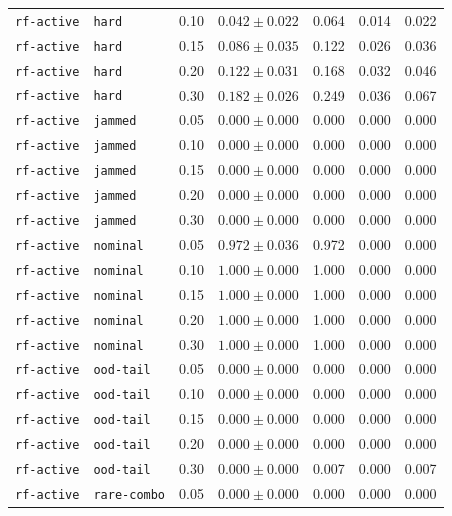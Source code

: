 \documentclass{article}
\begin{document}
\begin{center}
\begin{tabular}{lllcccc}
\texttt{rf-active} & \texttt{hard} & 0.10 & $0.042 \pm 0.022$ & 0.064 & 0.014 & 0.022 \\
\texttt{rf-active} & \texttt{hard} & 0.15 & $0.086 \pm 0.035$ & 0.122 & 0.026 & 0.036 \\
\texttt{rf-active} & \texttt{hard} & 0.20 & $0.122 \pm 0.031$ & 0.168 & 0.032 & 0.046 \\
\texttt{rf-active} & \texttt{hard} & 0.30 & $0.182 \pm 0.026$ & 0.249 & 0.036 & 0.067 \\
\texttt{rf-active} & \texttt{jammed} & 0.05 & $0.000 \pm 0.000$ & 0.000 & 0.000 & 0.000 \\
\texttt{rf-active} & \texttt{jammed} & 0.10 & $0.000 \pm 0.000$ & 0.000 & 0.000 & 0.000 \\
\texttt{rf-active} & \texttt{jammed} & 0.15 & $0.000 \pm 0.000$ & 0.000 & 0.000 & 0.000 \\
\texttt{rf-active} & \texttt{jammed} & 0.20 & $0.000 \pm 0.000$ & 0.000 & 0.000 & 0.000 \\
\texttt{rf-active} & \texttt{jammed} & 0.30 & $0.000 \pm 0.000$ & 0.000 & 0.000 & 0.000 \\
\texttt{rf-active} & \texttt{nominal} & 0.05 & $0.972 \pm 0.036$ & 0.972 & 0.000 & 0.000 \\
\texttt{rf-active} & \texttt{nominal} & 0.10 & $1.000 \pm 0.000$ & 1.000 & 0.000 & 0.000 \\
\texttt{rf-active} & \texttt{nominal} & 0.15 & $1.000 \pm 0.000$ & 1.000 & 0.000 & 0.000 \\
\texttt{rf-active} & \texttt{nominal} & 0.20 & $1.000 \pm 0.000$ & 1.000 & 0.000 & 0.000 \\
\texttt{rf-active} & \texttt{nominal} & 0.30 & $1.000 \pm 0.000$ & 1.000 & 0.000 & 0.000 \\
\texttt{rf-active} & \texttt{ood-tail} & 0.05 & $0.000 \pm 0.000$ & 0.000 & 0.000 & 0.000 \\
\texttt{rf-active} & \texttt{ood-tail} & 0.10 & $0.000 \pm 0.000$ & 0.000 & 0.000 & 0.000 \\
\texttt{rf-active} & \texttt{ood-tail} & 0.15 & $0.000 \pm 0.000$ & 0.000 & 0.000 & 0.000 \\
\texttt{rf-active} & \texttt{ood-tail} & 0.20 & $0.000 \pm 0.000$ & 0.000 & 0.000 & 0.000 \\
\texttt{rf-active} & \texttt{ood-tail} & 0.30 & $0.000 \pm 0.000$ & 0.007 & 0.000 & 0.007 \\
\texttt{rf-active} & \texttt{rare-combo} & 0.05 & $0.000 \pm 0.000$ & 0.000 & 0.000 & 0.000 \\

\end{tabular}
\end{center}
\end{document}
